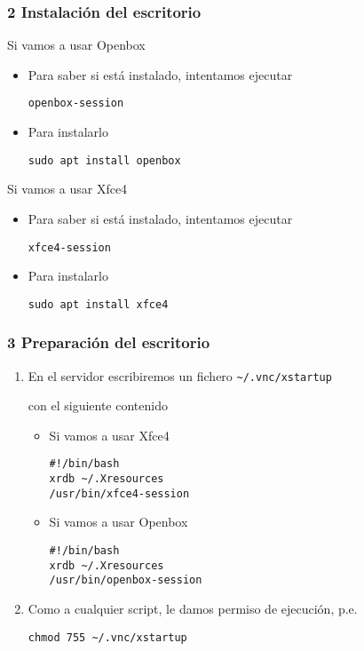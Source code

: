 \documentclass[ucs]{beamer}
\begin{document}
\begin{frame}[fragile]
\frametitle{2 Instalación del escritorio}
Si vamos a usar Openbox

\begin{itemize}
\item
Para saber si está instalado, intentamos ejecutar

\verb|openbox-session|

\item
Para instalarlo

\verb|sudo apt install openbox|
\end{itemize}


Si vamos a usar Xfce4

\begin{itemize}
\item
Para saber si está instalado, intentamos ejecutar

\verb|xfce4-session|

\item
Para instalarlo

\verb|sudo apt install xfce4|
\end{itemize}

\end{frame}



\begin{frame}[fragile]
\frametitle{3 Preparación del escritorio}

    \begin{enumerate}
    \item
En el servidor escribiremos un fichero
\verb|~/.vnc/xstartup|

con el siguiente contenido
\begin{itemize}
\item
Si vamos a usar Xfce4

  \begin{scriptsize}
  \begin{verbatim}
#!/bin/bash
xrdb ~/.Xresources
/usr/bin/xfce4-session
  \end{verbatim}
  \end{scriptsize}

\item
Si vamos a usar Openbox


  \begin{scriptsize}
  \begin{verbatim}
#!/bin/bash
xrdb ~/.Xresources
/usr/bin/openbox-session
  \end{verbatim}
  \end{scriptsize}

\end{itemize}

    \item
Como a cualquier script, le damos permiso de ejecución, p.e.

\verb|chmod 755 ~/.vnc/xstartup|
    \end{enumerate}
\end{frame}
\end{document}
